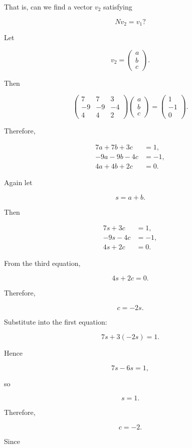\documentclass[11pt]{article}
\begin{document}
That is, can we find a vector \(v_2\) satisfying

\[
\boxed{
Nv_2=v_1?
}
\]

Let

\[
v_2=
\begin{pmatrix}
a\\
b\\
c
\end{pmatrix}.
\]

Then

\[
\begin{pmatrix}
7&7&3\\
-9&-9&-4\\
4&4&2
\end{pmatrix}
\begin{pmatrix}
a\\
b\\
c
\end{pmatrix}
=
\begin{pmatrix}
1\\
-1\\
0
\end{pmatrix}.
\]

Therefore,

\[
\begin{aligned}
7a+7b+3c&=1,\\
-9a-9b-4c&=-1,\\
4a+4b+2c&=0.
\end{aligned}
\]

Again let

\[
s=a+b.
\]

Then

\[
\begin{aligned}
7s+3c&=1,\\
-9s-4c&=-1,\\
4s+2c&=0.
\end{aligned}
\]

From the third equation,

\[
4s+2c=0.
\]

Therefore,

\[
c=-2s.
\]

Substitute into the first equation:

\[
7s+3(-2s)=1.
\]

Hence

\[
7s-6s=1,
\]

so

\[
s=1.
\]

Therefore,

\[
c=-2.
\]

Since
\end{document}
